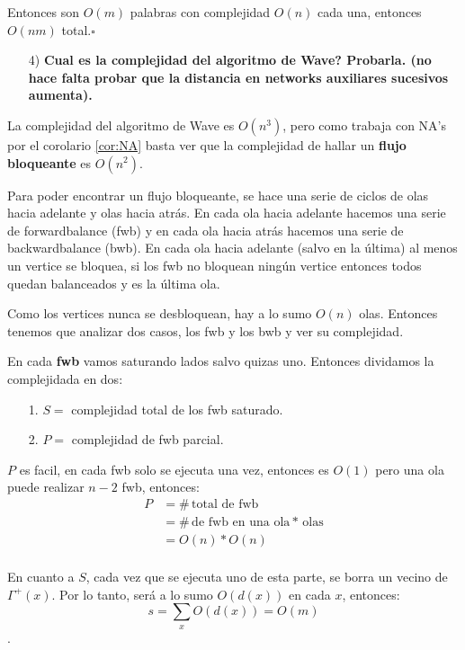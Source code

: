 \documentclass[12pt,a4paper]{article}
\begin{document}
Entonces son $O(m)$ palabras con complejidad $O(n)$ cada una, entonces $O(nm)$ 
total.$\square$

\begin{itemize}
    \item [4)] \textbf{Cual es la complejidad del algoritmo de Wave? Probarla. 
    (no hace falta probar que la distancia en networks auxiliares sucesivos 
    aumenta).}
    \label{dem:Wave}
\end{itemize}

La complejidad del algoritmo de Wave es $O(n^{3})$, pero como trabaja con NA's 
por el corolario \ref{cor:NA} basta ver que la complejidad de hallar un
\textbf{flujo bloqueante} es $O(n^{2})$.
\medskip

Para poder encontrar un flujo bloqueante, se hace una serie de ciclos de olas 
hacia adelante y olas hacia atrás. En cada ola hacia adelante hacemos una serie 
de forwardbalance (fwb) y en cada ola hacia atrás hacemos una serie de
backwardbalance (bwb). En cada ola hacia adelante (salvo en la última) al menos 
un vertice se bloquea, si los fwb no bloquean ningún vertice entonces todos 
quedan balanceados y es la última ola.
\medskip

Como los vertices nunca se desbloquean, hay a lo sumo $O(n)$ olas. Entonces tenemos 
que analizar dos casos, los fwb y los bwb y ver su complejidad. 
\medskip

En cada \textbf{fwb} vamos saturando lados salvo quizas uno. Entonces dividamos la 
complejidada en dos:
\begin{itemize}
    \item [1.] $S=$ complejidad total de los fwb saturado.
    \item [2.] $P=$ complejidad de fwb parcial.
\end{itemize}

$P$ es facil, en cada fwb solo se ejecuta una vez, entonces es $O(1)$ pero una 
ola puede realizar $n-2$ fwb, entonces:
\begin{align*}
    P &= \#\,\text{total de fwb}\\
    &= \#\,\text{de fwb en una ola} * \,\text{olas}\\
    &= O(n) * O(n)\\
\end{align*}

En cuanto a $S$, cada vez que se ejecuta uno de esta parte, se borra un vecino de 
$\Gamma^{+}(x)$. Por lo tanto, será a lo sumo $O(d(x))$ en cada $x$, entonces:
$$s = \sum_{x} O(d(x)) = O(m)$$.
\medskip
\end{document}
